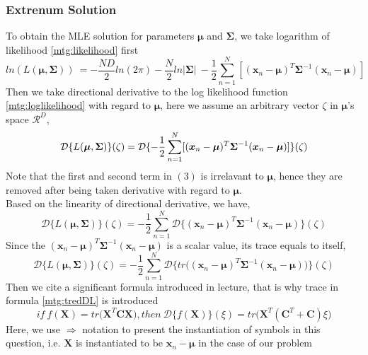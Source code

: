 \documentclass[11pt,a4paper]{article}
\newcommand{\htab}{\hspace*{0.63cm}}
\newcommand{\dd}[2]{\mathcal{D}\{ #1 \} (#2)}
\newcommand{\bs}[1]{\boldsymbol{#1}}
\newcommand{\bmu}{\boldsymbol{\mu}}
\newcommand{\bsum}{\boldsymbol{\Sigma}}
\newcommand{\xnv}{\boldsymbol{x}_{n} }
\newcommand{\R}{\mathcal{R}}
\begin{document}
\subsubsection{Extrenum Solution}
\htab To obtain the MLE solution for parameters $\bmu$ and $\bsum$,
    we take logarithm of likelihood \eqref{mtg:likelihood} first
    \begin{equation}  \label{mtg:loglikelihood}
    ln(L(\bmu,\bsum)) \
    = -\frac{ND}{2}ln(2\pi) - \frac{N}{2} ln|\bsum| \ 
        -\frac{1}{2} \sum_{n=1}^{N} [ (\xnv-\bmu)^{T} \bsum^{-1} (\xnv-\bmu)] \ 
    \end{equation}
\htab Then we take directional derivative to the log likelihood function \eqref{mtg:loglikelihood} with regard to $\bmu$, 
    here we assume an arbitrary vector $ \zeta $ in $\bmu$'s space $\R^{D}$,
    \begin{equation}  
            \dd{L(\bmu,\bsum)}{\zeta}
         = \dd{-\frac{1}{2} \sum_{n=1}^{N} [ (\xnv-\bmu)^{T} \bsum^{-1} (\xnv-\bmu) ]}{\zeta} \\
    \end{equation}
\htab Note that the first and second term in $(3)$ is irrelavant to $\bmu$, hence they are removed after being taken derivative with regard to $\bmu$. \\
\htab Based on the linearity of directional derivative, we have, 
    \begin{equation}
        \dd{L(\bmu,\bsum)}{\zeta}
        = -\frac{1}{2} \sum_{n=1}^{N} \dd{(\xnv-\bmu)^{T} \bsum^{-1} (\xnv-\bmu)}{\zeta}
    \end{equation}
\htab Since the $(\xnv-\bmu)^{T} \bsum^{-1} (\xnv-\bmu)$ is a scalar value, its trace equals to itself,
    \begin{equation} \label{mtg:tredDL}
        \dd{L(\bmu,\bsum)}{\zeta}
        = -\frac{1}{2} \sum_{n=1}^{N} \dd{tr\big( (\xnv-\bmu)^{T} \bsum^{-1} (\xnv-\bmu) \big)}{\zeta}
    \end{equation}
\htab Then we cite a significant formula introduced in lecture, 
    that is why trace in formula \eqref{mtg:tredDL} is introduced \\
    \begin{equation} \label{mtg:citedFormula}
        if \ f(\bs{X}) = tr\big(\bs{X}^{T} \bs{C} \bs{X} \big), then \
        \dd{f(\bs{X})}{\xi} = tr\big( \bs{X}^{T} (\bs{C}^{T} + \bs{C}) \xi \big)
    \end{equation}
\htab Here, we use $\Rightarrow$ notation to present the instantiation of symbols in this question,
    i.e. $\bs{X}$ is instantiated to be $\xnv-\bmu$ in the case of our problem \\
\end{document}
